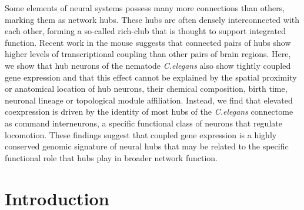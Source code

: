 Some elements of neural systems possess many more connections than others, marking them as network hubs.
These hubs are often densely interconnected with each other, forming a so-called rich-club that is thought to support integrated function.
Recent work in the mouse suggests that connected pairs of hubs show higher levels of transcriptional coupling than other pairs of brain regions.
Here, we show that hub neurons of the nematode \textit{C.elegans} also show tightly coupled gene expression and that this effect cannot be explained by the spatial proximity or anatomical location of hub neurons, their chemical composition, birth time, neuronal lineage or topological module affiliation.
Instead, we find that elevated coexpression is driven by the identity of most hubs of the \textit{C.elegans} connectome as command interneurons, a specific functional class of neurons that regulate locomotion.
These findings suggest that coupled gene expression is a highly conserved genomic signature of neural hubs that may be related to the specific functional role that hubs play in broader network function.

\section{Introduction}
\label{sec:introduction_ch2}


